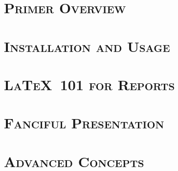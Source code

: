 \def \uswdwmspkg{\texttt{uswdwms} package}

\pagebreak
\part{\textsc{Primer Overview}}

\pagebreak
\part{\textsc{Installation and Usage}}

\pagebreak
\part{\textsc{\LaTeX\ 101 for Reports}}

\pagebreak
\part{\textsc{Fanciful Presentation}}

\pagebreak
\part{\textsc{Advanced Concepts}}

\pagebreak


